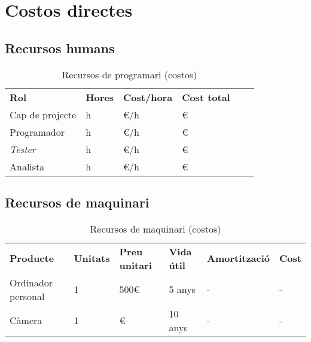 \def\arraystretch{1.4}

\section{Costos directes}

	\subsection{Recursos humans}
		\begin{table}[H]
			\begin{center}
				\begin{tabular}{l !{\vrule width -1pt}l !{\vrule width -1pt}l !{\vrule width -1pt}l !{\vrule width -1pt}l !{\vrule width -1pt}l}
					\textbf{Rol} & \textbf{Hores} & \textbf{Cost/hora} & \textbf{Cost total} \\
					Cap de projecte & h & €{}/h & € \\
					Programador & h & €/h & € \\
					\textit{Tester} & h & €/h & € \\
					Analista & h & €/h & € \\
				\end{tabular}
			\end{center}
			\caption{Recursos de programari (costos)}
		\end{table}

	\subsection{Recursos de maquinari}

		\begin{table}[H]
			\begin{center}
				\begin{tabular}{l !{\vrule width -1pt}l !{\vrule width -1pt}l !{\vrule width -1pt}l !{\vrule width -1pt}l !{\vrule width -1pt}l}
					\textbf{Producte} & \textbf{Unitats} & \textbf{Preu unitari} & \textbf{Vida útil} & \textbf{Amortització} & \textbf{Cost} \\
					Ordinador personal & 1 & 500€ & 5 anys & - & - \\
					Càmera & 1 & € & 10 anys & - & - \\
				\end{tabular}
			\end{center}
			\caption{Recursos de maquinari (costos)}
		\end{table}

